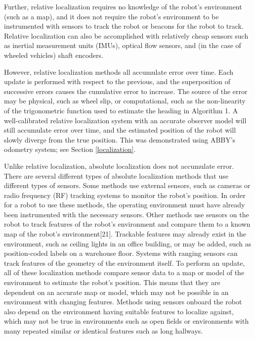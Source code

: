\documentclass[]{cwru} %
\begin{document}
Further, relative localization requires no knowledge of the robot's
environment (such as a map), and it does not require the robot's
environment to be instrumented with sensors to track the robot or
beacons for the robot to track. Relative localization can also be
accomplished with relatively cheap sensors such as inertial measurement
units (IMUs), optical flow sensors, and (in the case of wheeled
vehicles) shaft encoders.

However, relative localization methods all accumulate error over time.
Each update is performed with respect to the previous, and the
superposition of successive errors causes the cumulative error to
increase. The source of the error may be physical, such as wheel slip,
or computational, such as the non-linearity of the trigonometric
function used to estimate the heading in Algorithm 1. A well-calibrated
relative localization system with an accurate observer model will still
accumulate error over time, and the estimated position of the robot will
slowly diverge from the true position. This was demonstrated using
ABBY's odometry system; see Section \ref{localization}.

Unlike relative localization, absolute localization does not accumulate
error. There are several different types of absolute localization
methods that use different types of sensors. Some methods use external
sensors, such as cameras or radio frequency (RF) tracking systems to
monitor the robot's position. In order for a robot to use these methods,
the operating environment must have already been instrumented with the
necessary sensors. Other methods use sensors on the robot to track
features of the robot's environment and compare them to a known map of
the robot's environment{[}21{]}. Trackable features may already exist in
the environment, such as ceiling lights in an office building, or may be
added, such as position-coded labels on a warehouse floor. Systems with
ranging sensors can track features of the geometry of the environment
itself. To perform an update, all of these localization methods compare
sensor data to a map or model of the environment to estimate the robot's
position. This means that they are dependent on an accurate map or
model, which may not be possible in an environment with changing
features. Methods using sensors onboard the robot also depend on the
environment having suitable features to localize against, which may not
be true in environments such as open fields or environments with many
repeated similar or identical features such as long hallways.
\end{document}
